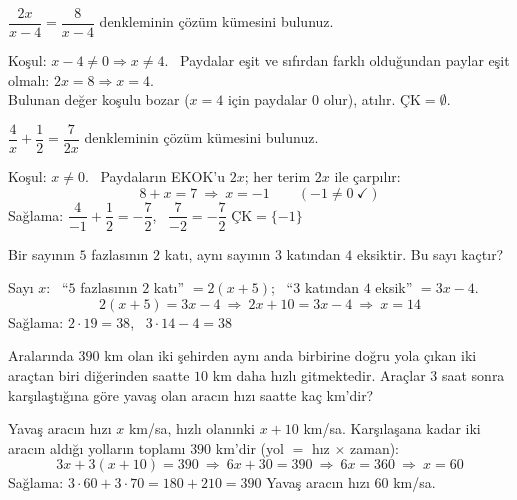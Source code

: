 \begin{alistirma}
\(\dfrac{2x}{x-4}=\dfrac{8}{x-4}\) denkleminin çözüm kümesini bulunuz.
\end{alistirma}
\begin{cozum}
Koşul: \(x-4\neq 0\Rightarrow x\neq 4\). \ Paydalar eşit ve sıfırdan farklı olduğundan paylar eşit olmalı: \(2x=8\Rightarrow x=4\).\\
Bulunan değer koşulu bozar (\(x=4\) için paydalar \(0\) olur), atılır. \quad \(\text{ÇK}=\emptyset\).
\end{cozum}

\begin{alistirma}
\(\dfrac{4}{x}+\dfrac{1}{2}=\dfrac{7}{2x}\) denkleminin çözüm kümesini bulunuz.
\end{alistirma}
\begin{cozum}
Koşul: \(x\neq 0\). \ Paydaların EKOK'u \(2x\); her terim \(2x\) ile çarpılır:
\[8+x=7\ \Rightarrow\ x=-1\qquad(-1\neq 0\ \checkmark)\]
Sağlama: \(\dfrac{4}{-1}+\dfrac{1}{2}=-\dfrac{7}{2}\), \ \(\dfrac{7}{-2}=-\dfrac{7}{2}\) \checkmark \qquad \(\text{ÇK}=\{-1\}\)
\end{cozum}

\begin{alistirma}
Bir sayının \(5\) fazlasının \(2\) katı, aynı sayının \(3\) katından \(4\) eksiktir. Bu sayı kaçtır?
\end{alistirma}
\begin{cozum}
Sayı \(x\): \ ``\(5\) fazlasının \(2\) katı'' \(=2(x+5)\); \ ``\(3\) katından \(4\) eksik'' \(=3x-4\).
\[2(x+5)=3x-4\ \Rightarrow\ 2x+10=3x-4\ \Rightarrow\ x=14\]
Sağlama: \(2\cdot 19=38\), \ \(3\cdot 14-4=38\) \checkmark
\end{cozum}

\begin{alistirma}
Aralarında \(390\) km olan iki şehirden aynı anda birbirine doğru yola çıkan iki araçtan biri diğerinden saatte \(10\) km daha hızlı gitmektedir. Araçlar \(3\) saat sonra karşılaştığına göre yavaş olan aracın hızı saatte kaç km'dir?
\end{alistirma}
\begin{cozum}
Yavaş aracın hızı \(x\) km/sa, hızlı olanınki \(x+10\) km/sa. Karşılaşana kadar iki aracın aldığı yolların toplamı \(390\) km'dir (yol \(=\) hız \(\times\) zaman):
\[3x+3(x+10)=390\ \Rightarrow\ 6x+30=390\ \Rightarrow\ 6x=360\ \Rightarrow\ x=60\]
Sağlama: \(3\cdot 60+3\cdot 70=180+210=390\) \checkmark \quad Yavaş aracın hızı \(60\) km/sa.
\end{cozum}

